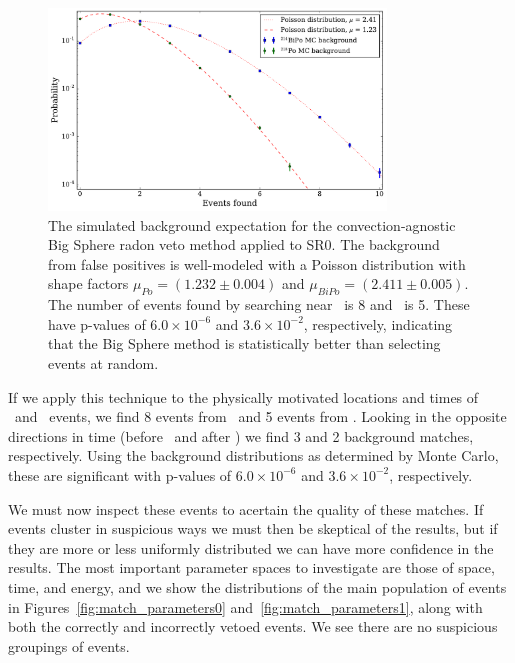 \begin{figure}[htb]
\centering
    \includegraphics[width=0.8\textwidth]{figures/rnveto/sr0_bigsphere_bkg}
    \caption{The simulated background expectation for the convection-agnostic Big Sphere radon veto method applied to SR0. The background from false positives is well-modeled with a Poisson distribution with shape factors $\mu_{Po} = (1.232 \pm 0.004)$ and $\mu_{BiPo} = (2.411 \pm 0.005)$. The number of events found by searching near \Po~is 8 and \BiPo~is 5. These have p-values of $6.0\times10^{-6}$ and $3.6\times10^{-2}$, respectively, indicating that the Big Sphere method is statistically better than selecting events at random.}\label{fig:bs_sr0}
\end{figure}

If we apply this technique to the physically motivated locations and times of \Po~and \BiPo~events, we find 8 events from \Po~and 5 events from \BiPo. Looking in the opposite directions in time (before \Po~and after \BiPo) we find 3 and 2 background matches, respectively. Using the background distributions as determined by Monte Carlo, these are significant with p-values of $6.0\times10^{-6}$ and $3.6\times10^{-2}$, respectively.

We must now inspect these events to acertain the quality of these matches. If events cluster in suspicious ways we must then be skeptical of the results, but if they are more or less uniformly distributed we can have more confidence in the results. The most important parameter spaces to investigate are those of space, time, and energy, and we show the distributions of the main population of events in Figures~\ref{fig:match_parameters0} and~\ref{fig:match_parameters1}, along with both the correctly and incorrectly vetoed events. We see there are no suspicious groupings of events.

